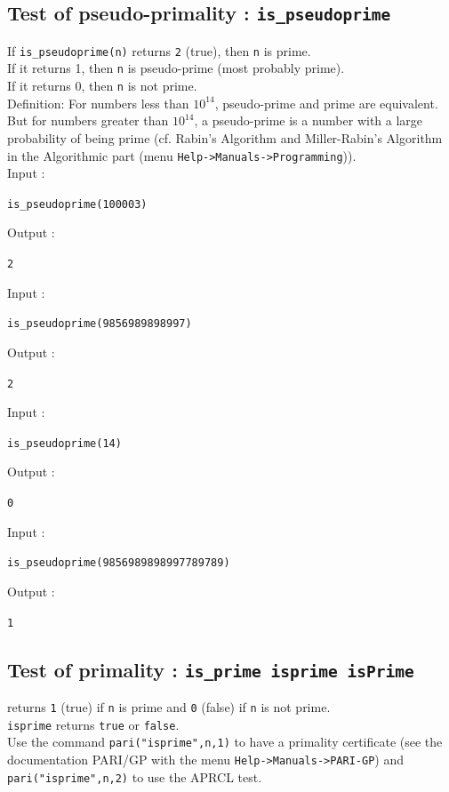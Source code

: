 \documentclass[a4paper,11pt]{book}
\begin{document}
\subsection{Test of pseudo-primality : {\tt is\_pseudoprime}}
\noindent If {\tt is\_pseudoprime(n)} returns {\tt 2} (true), then
{\tt n} is prime.\\ 
If it returns 1, then {\tt n} is pseudo-prime (most
probably prime).\\
 If it returns 0, then {\tt n} is not prime. \\
{\sc Definition}: For numbers less than  $10^{14}$, pseudo-prime and prime
are equivalent. But for numbers greater than  $10^{14}$, a pseudo-prime
 is a number with a large probability of being prime (cf. Rabin's Algorithm and
Miller-Rabin's Algorithm in the Algorithmic part (menu 
{\tt Help->Manuals->Programming})).\\
Input :
\begin{center}{\tt is\_pseudoprime(100003) }\end{center}
Output :
\begin{center}{\tt 2}\end{center}
Input :
\begin{center}{\tt is\_pseudoprime(9856989898997) }\end{center}
Output :
\begin{center}{\tt 2}\end{center} 
Input :
\begin{center}{\tt is\_pseudoprime(14) }\end{center}
Output :
\begin{center}{\tt 0}\end{center}
Input :
\begin{center}{\tt is\_pseudoprime(9856989898997789789) }\end{center}
Output :
\begin{center}{\tt 1}\end{center}

\subsection{Test of primality : {\tt is\_prime isprime isPrime}}
 returns {\tt 1} (true) if {\tt n} is prime and 
{\tt 0} (false) if {\tt n} is not prime.\\
{\tt isprime} returns {\tt true} or {\tt false}.\\
Use the command {\tt pari("isprime",n,1)}
to have a primality certificate (see the documentation
 PARI/GP with the menu {\tt Help->Manuals->PARI-GP}) and 
{\tt pari("isprime",n,2)} to use the APRCL test.
\end{document}
